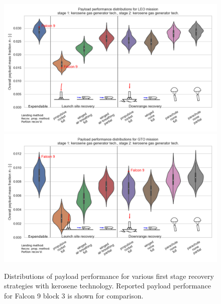 \documentclass[conf]{new-aiaa}
\begin{document}
\begin{multicols}{2}
\begin{figure}
    \centering
    \includegraphics[width=\textwidth]{strategy_perf_annotated/LEO_kero}
    \includegraphics[width=\textwidth]{strategy_perf_annotated/GTO_kero}
    \caption{\label{fig:strategy_perf_kerosene} Distributions of payload performance for various first stage recovery strategies with kerosene technology. Reported payload performance for Falcon 9 block 3 is shown for comparison.}
\end{figure}


\end{multicols}
\end{document}

